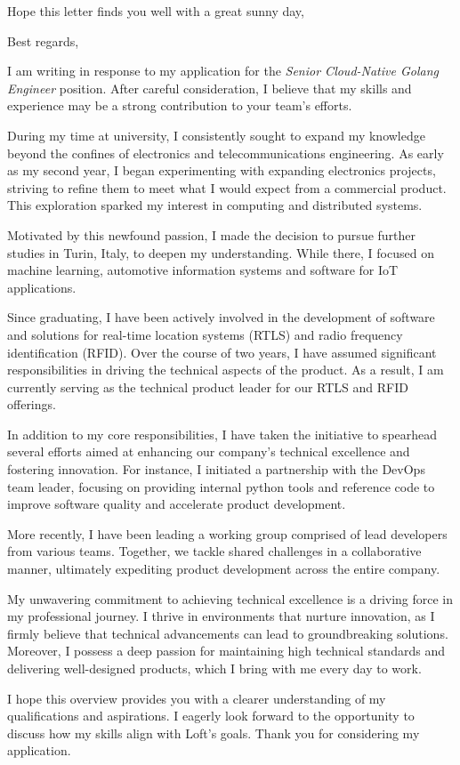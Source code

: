 \documentclass[11pt,a4paper,roman]{moderncv}
\begin{document}
\date{\today}
\opening{Hope this letter finds you well with a great sunny day,}
\closing{Best regards,}
\makelettertitle

I am writing in response to my application for the \emph{Senior Cloud-Native Golang Engineer} position. After careful consideration, I believe that my skills and experience may be a strong contribution to your team's efforts.

During my time at university, I consistently sought to expand my knowledge beyond the confines of electronics and telecommunications engineering. As early as my second year, I began experimenting with expanding electronics projects, striving to refine them to meet what I would expect from a commercial product. This exploration sparked my interest in computing and distributed systems.

Motivated by this newfound passion, I made the decision to pursue further studies in Turin, Italy, to deepen my understanding. While there, I focused on machine learning, automotive information systems and software for IoT applications.

Since graduating, I have been actively involved in the development of software and solutions for real-time location systems (RTLS) and radio frequency identification (RFID). Over the course of two years, I have assumed significant responsibilities in driving the technical aspects of the product. As a result, I am currently serving as the technical product leader for our RTLS and RFID offerings.

In addition to my core responsibilities, I have taken the initiative to spearhead several efforts aimed at enhancing our company's technical excellence and fostering innovation. For instance, I initiated a partnership with the DevOps team leader, focusing on providing internal python tools and reference code to improve software quality and accelerate product development.

More recently, I have been leading a working group comprised of lead developers from various teams. Together, we tackle shared challenges in a collaborative manner, ultimately expediting product development across the entire company.

My unwavering commitment to achieving technical excellence is a driving force in my professional journey. I thrive in environments that nurture innovation, as I firmly believe that technical advancements can lead to groundbreaking solutions. Moreover, I possess a deep passion for maintaining high technical standards and delivering well-designed products, which I bring with me every day to work.

I hope this overview provides you with a clearer understanding of my qualifications and aspirations. I eagerly look forward to the opportunity to discuss how my skills align with Loft's goals. Thank you for considering my application.

\vspace{0.5cm}

\makeletterclosing
\end{document}

